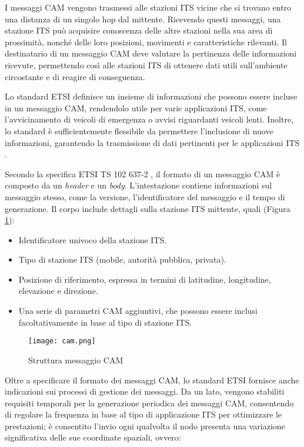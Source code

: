I messaggi CAM vengono trasmessi alle stazioni ITS vicine che si trovano entro una distanza di un singolo hop dal mittente. Ricevendo questi messaggi, una stazione ITS può acquisire conoscenza delle altre stazioni nella sua area di prossimità, nonché delle loro posizioni, movimenti e caratteristiche rilevanti. Il destinatario di un messaggio CAM deve valutare la pertinenza delle informazioni ricevute, permettendo così alle stazioni ITS di ottenere dati utili sull'ambiente circostante e di reagire di conseguenza.

Lo standard ETSI definisce un insieme di informazioni che possono essere incluse in un messaggio CAM, rendendolo utile per varie applicazioni ITS, come l'avvicinamento di veicoli di emergenza o avvisi riguardanti veicoli lenti. Inoltre, lo standard è sufficientemente flessibile da permettere l'inclusione di nuove informazioni, garantendo la trasmissione di dati pertinenti per le applicazioni ITS \cite{cam_denm}.

Secondo la specifica ETSI TS 102 637-2 \cite{etsi2010102}, il formato di un messaggio CAM è composto da un \textit{header} e un \textit{body}. L'intestazione contiene informazioni sul messaggio stesso, come la versione, l'identificatore del messaggio e il tempo di generazione. Il corpo include dettagli sulla stazione ITS mittente, quali (Figura \ref{fig:cam}):

\begin{itemize}
    \item Identificatore univoco della stazione ITS.
    \item Tipo di stazione ITS (mobile, autorità pubblica, privata).
    \item Posizione di riferimento, espressa in termini di latitudine, longitudine, elevazione e direzione.
    \item Una serie di parametri CAM aggiuntivi, che possono essere inclusi facoltativamente in base al tipo di stazione ITS.
\end{itemize}

\begin{figure}[h!]
    \centering
    \texttt{[image: cam.png]}
    \caption{Struttura messaggio CAM}
    \label{fig:cam}
\end{figure}

Oltre a specificare il formato dei messaggi CAM, lo standard ETSI fornisce anche indicazioni sui processi di gestione dei messaggi. Da un lato, vengono stabiliti requisiti temporali per la generazione periodica dei messaggi CAM, consentendo di regolare la frequenza in base al tipo di applicazione ITS per ottimizzare le prestazioni; è consentito l'invio ogni qualvolta il nodo presenta una variazione significativa delle sue coordinate spaziali, ovvero:

